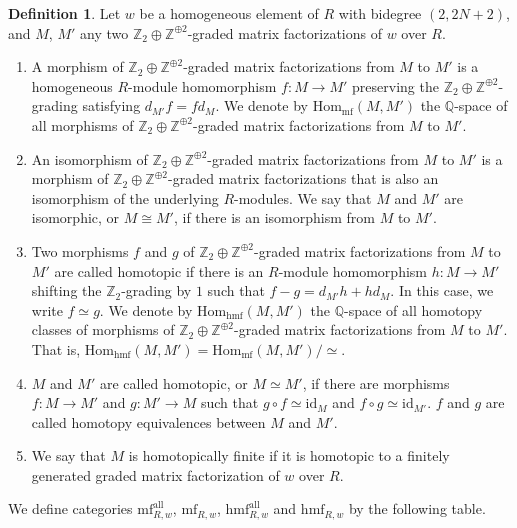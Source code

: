 \documentclass{amsart}
\theoremstyle{plain}
\theoremstyle{definition}
\newtheorem{definition}[theorem]{Definition}
\theoremstyle{remark}
\numberwithin{equation}{section}
\begin{document}
\begin{definition}\label{def-morph-mf}
Let $w$ be a homogeneous element of $R$ with bidegree $(2,2N+2)$, and $M$, $M'$ any two ${\mathbb{Z}}_2\oplus{\mathbb{Z}}^{\oplus2}$-graded matrix factorizations of $w$ over $R$. 
\begin{enumerate}
	\item A morphism of ${\mathbb{Z}}_2\oplus{\mathbb{Z}}^{\oplus2}$-graded matrix factorizations from $M$ to $M'$ is a homogeneous $R$-module homomorphism $f:M\rightarrow M'$ preserving the ${\mathbb{Z}}_2\oplus{\mathbb{Z}}^{\oplus2}$-grading satisfying $d_{M'}f=fd_{M}$. We denote by ${\mathrm{Hom}}_{\mathrm{mf}}(M,M')$ the ${\mathbb{Q}}$-space of all morphisms of ${\mathbb{Z}}_2\oplus{\mathbb{Z}}^{\oplus2}$-graded matrix factorizations from $M$ to $M'$.
	\item An isomorphism of ${\mathbb{Z}}_2\oplus{\mathbb{Z}}^{\oplus2}$-graded matrix factorizations from $M$ to $M'$ is a morphism of ${\mathbb{Z}}_2\oplus{\mathbb{Z}}^{\oplus2}$-graded matrix factorizations that is also an isomorphism of the underlying $R$-modules. We say that $M$ and $M'$ are isomorphic, or $M\cong M'$, if there is an isomorphism from $M$ to $M'$.
	\item Two morphisms $f$ and $g$ of ${\mathbb{Z}}_2\oplus{\mathbb{Z}}^{\oplus2}$-graded matrix factorizations from $M$ to $M'$ are called homotopic if there is an $R$-module homomorphism $h:M\rightarrow M'$ shifting the ${\mathbb{Z}}_2$-grading by $1$ such that $f-g = d_{M'}h+hd_M$. In this case, we write $f \simeq g$. We denote by ${\mathrm{Hom}}_{\mathrm{hmf}}(M,M')$ the ${\mathbb{Q}}$-space of all homotopy classes of morphisms of ${\mathbb{Z}}_2\oplus{\mathbb{Z}}^{\oplus2}$-graded matrix factorizations from $M$ to $M'$. That is, ${\mathrm{Hom}}_{\mathrm{hmf}}(M,M') = {\mathrm{Hom}}_{\mathrm{mf}}(M,M') / \simeq$.
	\item $M$ and $M'$ are called homotopic, or $M\simeq M'$, if there are morphisms $f:M\rightarrow M'$ and $g:M'\rightarrow M$ such that $g\circ f \simeq {\mathrm{id}}_M$ and $f\circ g \simeq {\mathrm{id}}_{M'}$. $f$ and $g$ are called homotopy equivalences between $M$ and $M'$.
  \item We say that $M$ is homotopically finite if it is homotopic to a finitely generated graded matrix factorization of $w$ over $R$. 
\end{enumerate}

We define categories ${\mathrm{mf}}^{\mathrm{all}}_{R,w}$, ${\mathrm{mf}}_{R,w}$, ${\mathrm{hmf}}^{\mathrm{all}}_{R,w}$ and ${\mathrm{hmf}}_{R,w}$ by the following table. 


\end{definition}
\end{document}
